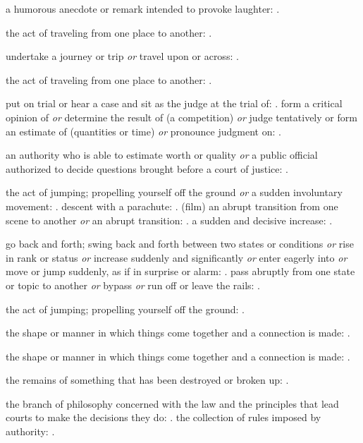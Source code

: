   a humorous anecdote or remark intended to provoke laughter: .

  the act of traveling from one place to another: .

  undertake a journey or trip \textit{or} travel upon or across: .

  the act of traveling from one place to another: .

  put on trial or hear a case and sit as the judge at the trial of: . form a critical opinion of \textit{or} determine the result of (a competition) \textit{or} judge tentatively or form an estimate of (quantities or time) \textit{or} pronounce judgment on: .

  an authority who is able to estimate worth or quality \textit{or} a public official authorized to decide questions brought before a court of justice: .

  the act of jumping; propelling yourself off the ground \textit{or} a sudden involuntary movement: . descent with a parachute: . (film) an abrupt transition from one scene to another \textit{or} an abrupt transition: . a sudden and decisive increase: .

  go back and forth; swing back and forth between two states or conditions \textit{or} rise in rank or status \textit{or} increase suddenly and significantly \textit{or} enter eagerly into \textit{or} move or jump suddenly, as if in surprise or alarm: . pass abruptly from one state or topic to another \textit{or} bypass \textit{or} run off or leave the rails: .

  the act of jumping; propelling yourself off the ground: .

  the shape or manner in which things come together and a connection is made: .

  the shape or manner in which things come together and a connection is made: .

  the remains of something that has been destroyed or broken up: .

  the branch of philosophy concerned with the law and the principles that lead courts to make the decisions they do: . the collection of rules imposed by authority: .

